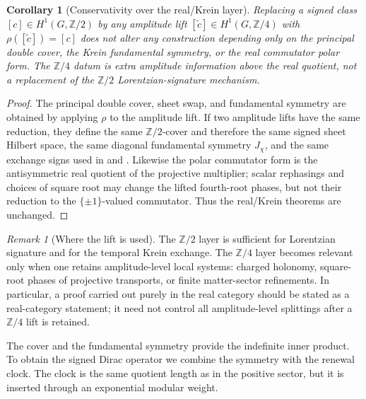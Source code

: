 \documentclass[11pt]{article}
\newtheorem{corollary}[theorem]{Corollary}
\theoremstyle{definition}
\theoremstyle{remark}
\newtheorem{remark}[theorem]{Remark}
\newcommand{\Ztwo}{\mathbb{Z}/2}
\newcommand{\Zfour}{\mathbb{Z}/4}
\begin{document}
\begin{corollary}[Conservativity over the real/Krein layer]
\label{cor:z4-conservative-real-layer}
Replacing a signed class \([c]\in H^1(G,\Ztwo)\) by any amplitude lift
\([\widetilde c]\in H^1(G,\Zfour)\) with \(\rho([\widetilde c])=[c]\) does not
alter any construction depending only on the principal double cover, the Krein
fundamental symmetry, or the real commutator polar form.  The \(\Zfour\) datum is
extra amplitude information above the real quotient, not a replacement of the
\(\Ztwo\) Lorentzian-signature mechanism.
\end{corollary}

\begin{proof}
The principal double cover, sheet swap, and fundamental symmetry are obtained by
applying \(\rho\) to the amplitude lift.  If two amplitude lifts have the same
reduction, they define the same \(\Ztwo\)-cover and therefore the same signed
sheet Hilbert space, the same diagonal fundamental symmetry \(J_\chi\), and the
same exchange signs used in  and
.  Likewise the polar commutator form is the
antisymmetric real quotient of the projective multiplier; scalar rephasings and
choices of square root may change the lifted fourth-root phases, but not their
reduction to the \(\{\pm1\}\)-valued commutator.  Thus the real/Krein theorems
are unchanged.
\end{proof}

\begin{remark}[Where the lift is used]
\label{rem:z4-lift-where-used}
The \(\Ztwo\) layer is sufficient for Lorentzian signature and for the temporal
Krein exchange.  The \(\Zfour\) layer becomes relevant only when one retains
amplitude-level local systems: charged holonomy, square-root phases of
projective transports, or finite matter-sector refinements.  In particular, a
proof carried out purely in the real category should be stated as a real-category
statement; it need not control all amplitude-level splittings after a
\(\Zfour\) lift is retained.
\end{remark}

The cover and the fundamental symmetry provide the indefinite inner product.
To obtain the signed Dirac operator we combine the symmetry with the renewal
clock.  The clock is the same quotient length as in the positive sector, but it
is inserted through an exponential modular weight.
\end{document}
